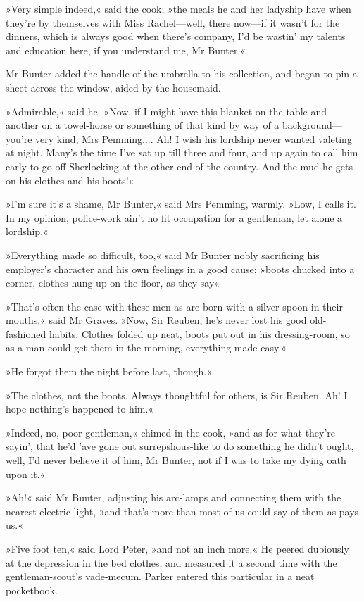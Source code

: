 »Very simple indeed,« said the cook; »the meals he and her ladyship have when they're by themselves with Miss Rachel—well, there now—if it wasn't for the dinners, which is always good when there's company, I'd be wastin' my talents and education here, if you understand me, Mr Bunter.«

Mr Bunter added the handle of the umbrella to his collection, and began to pin a sheet across the window, aided by the housemaid.

»Admirable,« said he. »Now, if I might have this blanket on the table and another on a towel-horse or something of that kind by way of a background—you're very kind, Mrs Pemming.... Ah! I wish his lordship never wanted valeting at night. Many's the time I've sat up till three and four, and up again to call him early to go off Sherlocking at the other end of the country. And the mud he gets on his clothes and his boots!«

»I'm sure it's a shame, Mr Bunter,« said Mrs Pemming, warmly. »Low, I calls it. In my opinion, police-work ain't no fit occupation for a gentleman, let alone a lordship.«

»Everything made so difficult, too,« said Mr Bunter nobly sacrificing his employer's character and his own feelings in a good cause; »boots chucked into a corner, clothes hung up on the floor, as they say\longdash«

»That's often the case with these men as are born with a silver spoon in their mouths,« said Mr Graves. »Now, Sir Reuben, he's never lost his good old-fashioned habits. Clothes folded up neat, boots put out in his dressing-room, so as a man could get them in the morning, everything made easy.«

»He forgot them the night before last, though.«

»The clothes, not the boots. Always thoughtful for others, is Sir Reuben. Ah! I hope nothing's happened to him.«

»Indeed, no, poor gentleman,« chimed in the cook, »and as for what they're sayin', that he'd 'ave gone out surrepshous-like to do something he didn't ought, well, I'd never believe it of him, Mr Bunter, not if I was to take my dying oath upon it.«

»Ah!« said Mr Bunter, adjusting his arc-lamps and connecting them with the nearest electric light, »and that's more than most of us could say of them as pays us.«

»Five foot ten,« said Lord Peter, »and not an inch more.« He peered dubiously at the depression in the bed clothes, and measured it a second time with the gentleman-scout's vade-mecum. Parker entered this particular in a neat pocketbook.

